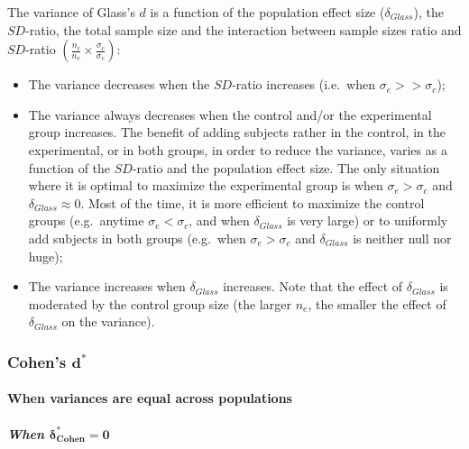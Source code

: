 \documentclass[
  english,
  man,mask]{apa6}
\providecommand{\tightlist}{%
  \setlength{\itemsep}{0pt}\setlength{\parskip}{0pt}}
\let\oldparagraph\paragraph
\renewcommand{\paragraph}[1]{\oldparagraph{#1}\mbox{}}
\let\oldsubparagraph\subparagraph
\renewcommand{\subparagraph}[1]{\oldsubparagraph{#1}\mbox{}}
\begin{document}
The variance of Glass's \(d\) is a function of the population effect size (\(\delta_{Glass}\)), the \(SD\)-ratio, the total sample size and the interaction between sample sizes ratio and \(SD\)-ratio \(\left(\frac{n_c}{n_e}\times\frac{\sigma_c}{\sigma_e} \right)\):

\begin{itemize}
\tightlist
\item
  The variance decreases when the \(SD\)-ratio increases (i.e.~when \(\sigma_e >> \sigma_c\));\\
\item
  The variance always decreases when the control and/or the experimental group increases. The benefit of adding subjects rather in the control, in the experimental, or in both groups, in order to reduce the variance, varies as a function of the \(SD\)-ratio and the population effect size. The only situation where it is optimal to maximize the experimental group is when \(\sigma_e > \sigma_c\) and \(\delta_{Glass} \approx 0\). Most of the time, it is more efficient to maximize the control groups (e.g.~anytime \(\sigma_e < \sigma_c\), and when \(\delta_{Glass}\) is very large) or to uniformly add subjects in both groups (e.g.~when \(\sigma_e > \sigma_c\) and \(\delta_{Glass}\) is neither null nor huge);
\item
  The variance increases when \(\delta_{Glass}\) increases. Note that the effect of \(\delta_{Glass}\) is moderated by the control group size (the larger \(n_e\), the smaller the effect of \(\delta_{Glass}\) on the variance).
\end{itemize}

\hypertarget{cohens-bmd-1}{%
\subsubsection{\texorpdfstring{Cohen's \(\bm{d^*}\)}{Cohen's \textbackslash bm\{d\^{}*\}}}\label{cohens-bmd-1}}

\hypertarget{when-variances-are-equal-across-populations-4}{%
\paragraph{When variances are equal across populations}\label{when-variances-are-equal-across-populations-4}}

\hypertarget{when-bmdelta_cohen-0}{%
\subparagraph{\texorpdfstring{When \(\bm{\delta^*_{Cohen} = 0}\)}{When \textbackslash bm\{\textbackslash delta\^{}*\_\{Cohen\} = 0\}}}\label{when-bmdelta_cohen-0}}
\end{document}
